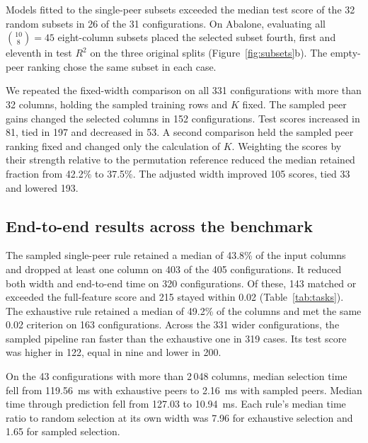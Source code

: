 \documentclass[11pt,a4paper]{article}
\begin{document}
Models fitted to the single-peer subsets exceeded the median test score of the 32 random subsets in 26 of the 31 configurations. On Abalone, evaluating all $\binom{10}{8}=45$ eight-column subsets placed the selected subset fourth, first and eleventh in test $R^2$ on the three original splits (Figure~\ref{fig:subsets}b). The empty-peer ranking chose the same subset in each case.

We repeated the fixed-width comparison on all 331 configurations with more than 32 columns, holding the sampled training rows and $K$ fixed. The sampled peer gains changed the selected columns in 152 configurations. Test scores increased in 81, tied in 197 and decreased in 53. A second comparison held the sampled peer ranking fixed and changed only the calculation of $K$. Weighting the scores by their strength relative to the permutation reference reduced the median retained fraction from 42.2\% to 37.5\%. The adjusted width improved 105 scores, tied 33 and lowered 193.

\FloatBarrier
\subsection{End-to-end results across the benchmark}
The sampled single-peer rule retained a median of 43.8\% of the input columns and dropped at least one column on 403 of the 405 configurations. It reduced both width and end-to-end time on 320 configurations. Of these, 143 matched or exceeded the full-feature score and 215 stayed within 0.02 (Table~\ref{tab:tasks}). The exhaustive rule retained a median of 49.2\% of the columns and met the same 0.02 criterion on 163 configurations. Across the 331 wider configurations, the sampled pipeline ran faster than the exhaustive one in 319 cases. Its test score was higher in 122, equal in nine and lower in 200.

On the 43 configurations with more than 2\,048 columns, median selection time fell from 119.56~ms with exhaustive peers to 2.16~ms with sampled peers. Median time through prediction fell from 127.03 to 10.94~ms. Each rule's median time ratio to random selection at its own width was 7.96 for exhaustive selection and 1.65 for sampled selection.
\end{document}
